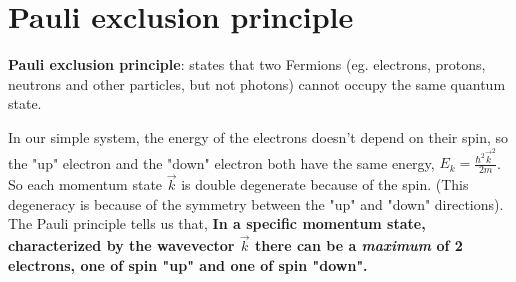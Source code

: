 \documentclass{Textbook}
\begin{document}
\section{Pauli exclusion principle}
\textbf{Pauli exclusion principle}: states that two Fermions (eg. electrons, protons, neutrons and other particles, but not photons) cannot occupy the same quantum state.

In our simple system, the energy of the electrons doesn't depend on their spin, so the "up" electron and the "down" electron both have the same energy, $E_k = \frac{\hbar^2 \vec{k}^2}{2m}$. So each momentum state $\vec{k}$ is double degenerate because of the spin. (This degeneracy is because of the symmetry between the "up" and "down" directions). The Pauli principle tells us that,\nl
\textbf{In a specific momentum state, characterized by the wavevector $\vec{k}$ there can be a \emph{maximum} of 2 electrons, one of spin "up" and one of spin "down".}
%
\end{document}
